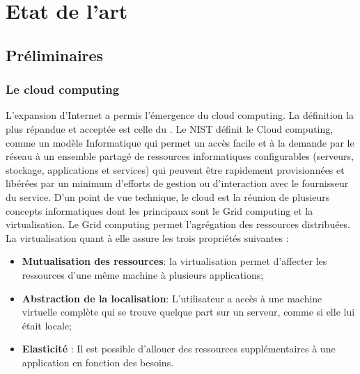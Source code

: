 \chapter{Etat de l'art} \newline{}
\section{Préliminaires}    
\label{sec:prelimin} 
\subsection{Le cloud computing} 
L’expansion d’Internet a permis l’émergence du   cloud computing. 
La définition la plus répandue et acceptée est celle du \cite{NIST}. Le NIST définit  le  Cloud computing, comme un modèle Informatique qui permet un accès facile et à la demande par le réseau à un ensemble partagé de ressources informatiques configurables (serveurs, stockage, applications et services) qui peuvent être rapidement provisionnées et libérées par  un minimum d’efforts de gestion ou d’interaction avec le fournisseur du service.
D’un point de vue technique,  le cloud est la réunion  de plusieurs concepts informatiques dont les  principaux sont le Grid computing \cite{Grid} et la virtualisation.  Le Grid computing permet l’agrégation des ressources distribuées. La virtualisation quant à elle assure les  trois propriétés suivantes :
\begin{itemize} 
 \item  \textbf{Mutualisation des ressources}: la virtualisation permet d’affecter les ressources d’une même machine à plusieurs applications;
 \item  \textbf{ Abstraction de la localisation}: L’utilisateur a accès à une machine virtuelle complète qui  se trouve  quelque part  sur un serveur, comme si elle lui était locale;
 \item  \textbf{Elasticité} : Il est possible d’allouer des ressources supplémentaires à une application en fonction des besoins.
\end{itemize}\newline

